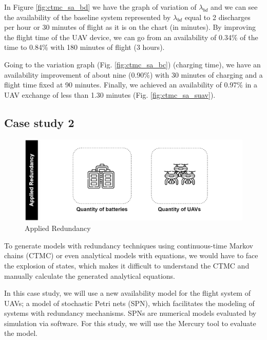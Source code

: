 \documentclass[conference]{IEEEtran}
\begin{document}
In Figure \ref{fig:ctmc_sa_bd} we have the graph of variation of $\lambda_{bd}$ and we can see the availability of the baseline system represented by $\lambda_{bd}$ equal to 2 discharges per hour or 30 minutes of flight as it is on the chart (in minutes). By improving the flight time of the UAV device, we can go from an availability of 0.34\% of the time to 0.84\% with 180 minutes of flight (3 hours). 

Going to the variation graph (Fig. \ref{fig:ctmc_sa_bc}) (charging time), we have an availability improvement of about nine (0.90\%) with 30 minutes of charging and a flight time fixed at 90 minutes. Finally, we achieved an availability of 0.97\% in a UAV exchange of less than 1.30 minutes (Fig. \ref{fig:ctmc_sa_suav}).



\subsection{Case study 2}\label{sec:case_studies_sub02}

\begin{figure}[htbp]
\centerline{\includegraphics[scale=0.22]{img/operating_model_study_02.png}}
\caption{Applied Redundancy}
\label{fig:case_study_02}
\end{figure}

To generate models with redundancy techniques using continuous-time Markov chains (CTMC) or even analytical models with equations, we would have to face the explosion of states, which makes it difficult to understand the CTMC and manually calculate the generated analytical equations.

In this case study, we will use a new availability model for the flight system of UAVs; a model of stochastic Petri nets (SPN), which facilitates the modeling of systems with redundancy mechanisms. SPNs are numerical models evaluated by simulation via software. For this study, we will use the Mercury tool to evaluate the \citep{maciel2017mercury} model.
\end{document}
